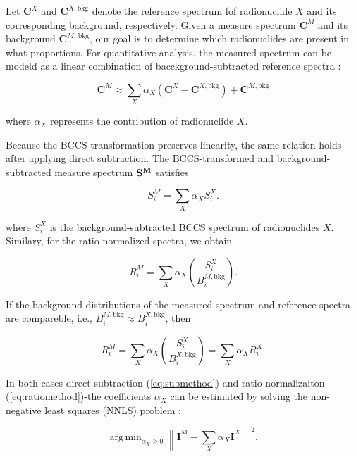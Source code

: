 \documentclass[10pt]{wlscirep}
\DeclareMathOperator*{\argmin}{arg\,min} %
\begin{document}
Let $\textbf{C}^X$ and $\textbf{C}^{X,\text{bkg}}$ denote the reference spectrum fof radionuclide $X$ and its corresponding background, respectively. Given a measure spectrum $\textbf{C}^M$ and its background $\textbf{C}^{M,\,\text{bkg}}$, our goal is to determine which radionuclides are present in what proportions. For quantitative analysis, the measured spectrum can be modeld as a linear combination of bacckground-subtracted reference spectra :

\begin{equation}
\textbf{C}^M \approx \sum_{X} \alpha_X (\textbf{C}^{X} - \textbf{C}^{X,\text{bkg}}) + \textbf{C}^{M,\textrm{bkg}}
\end{equation}

\noindent where $\alpha_X$ represents the contribution of radionuclide $X$. 

Because the BCCS transformation preserves linearity, the same relation holds after applying direct subtraction. The BCCS-transformed and background-subtracted measure spectrum $\bf{S}^M$ satisfies

\begin{equation}
S_i^M = \sum_X \alpha_X S_i^X.\label{eq:submethod}
\end{equation}

where $S^X_i$ is the background-subtracted BCCS spectrum of radionuclides $X$. Similary, for the ratio-normalized spectra, we obtain

\begin{equation*}
R_i^M = \sum_X \alpha_X \left(\dfrac{S_i^X}{B_i^{M,\text{bkg}}}\right).
\end{equation*}

If the background distributions of the measured spectrum and reference spectra are compareble, i.e., $B^{M,\text{bkg}}_i \approx B_i^{X,\text{bkg}}$, then

\begin{equation}
R_i^M = \sum_X \alpha_X \left(\dfrac{S_i^X}{B_i^{X,\text{bkg}}}\right) = \sum_X \alpha_X R_i^X.\label{eq:ratiomethod}
\end{equation}

In both cases-direct subtraction (\ref{eq:submethod}) and ratio normalizaiton (\ref{eq:ratiomethod})-the coefficients $\alpha_X$ can be estimated by solving the non-negative least squares (NNLS) problem :

\begin{equation}
\argmin_{\alpha_X \ge 0} \left\| \textbf{I}^{\text{M}} - \sum_{X} \alpha_X \textbf{I}^{X}\right\|^2,\label{eqn:llns}
\end{equation}
\end{document}
